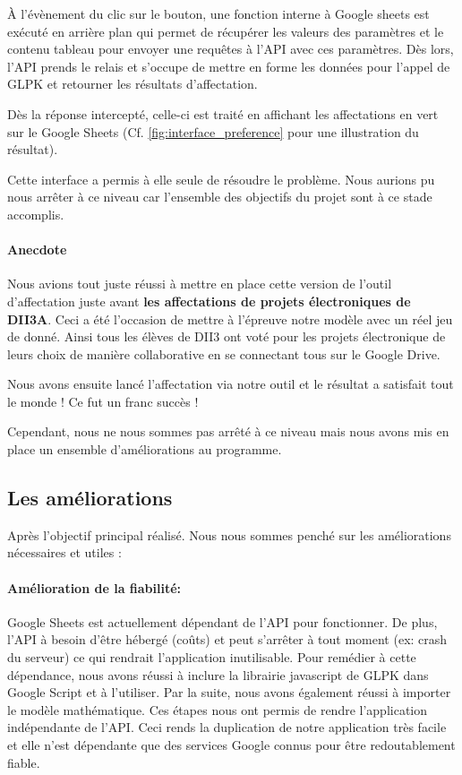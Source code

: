\documentclass[final,poster]{polytech/polytech}
\begin{document}
À l'évènement du clic sur le bouton, une fonction interne à Google sheets est exécuté en arrière plan qui permet de récupérer les valeurs des paramètres et le contenu tableau pour envoyer une requêtes à l’API avec ces paramètres.
Dès lors, l'API prends le relais et s'occupe de mettre en forme les données pour l'appel de GLPK et retourner les résultats d'affectation.

Dès la réponse intercepté, celle-ci est traité en affichant les affectations en vert sur le Google Sheets (Cf. \autoref{fig:interface_preference} pour une illustration du résultat). 

Cette interface a permis à elle seule de résoudre le problème. Nous aurions pu nous arrêter à ce niveau car l'ensemble des objectifs du projet sont à ce stade accomplis.


\paragraph{Anecdote}
\label{anec:affect_proj_elec}
Nous avions tout juste réussi à mettre en place cette version de l'outil d'affectation juste avant \textbf{les affectations de projets électroniques de DII3A}. Ceci a été l'occasion de mettre à l'épreuve notre modèle avec un réel jeu de donné. 
Ainsi tous les élèves de DII3 ont voté pour les projets électronique de leurs choix de manière collaborative en se connectant tous sur le Google Drive. 

Nous avons ensuite lancé l'affectation via notre outil et le résultat a satisfait tout le monde ! Ce fut un franc succès ! 

Cependant, nous ne nous sommes pas arrêté à ce niveau mais nous avons mis en place un ensemble d'améliorations au programme.


\subsection{Les améliorations}

Après l'objectif principal réalisé. Nous nous sommes penché sur les améliorations nécessaires et utiles :

\paragraph{Amélioration de la fiabilité:}
Google Sheets est actuellement dépendant de l’API pour fonctionner. De plus, l’API à besoin d'être hébergé (coûts) et peut s'arrêter à tout moment (ex: crash du serveur) ce qui rendrait l'application inutilisable. Pour remédier à cette dépendance, nous avons réussi à inclure la librairie javascript de GLPK dans Google Script et à l'utiliser. Par la suite, nous avons également réussi à importer le modèle mathématique.
Ces étapes nous ont permis de rendre l'application indépendante de l’API. Ceci rends la duplication de notre application très facile et elle n'est dépendante que des services Google connus pour être redoutablement fiable.
\end{document}
